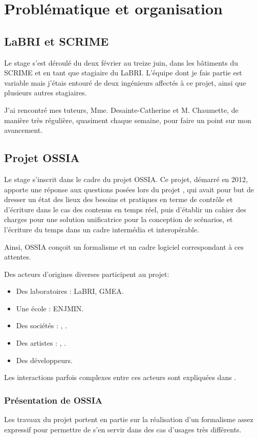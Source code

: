 \chapter{Problématique et organisation}
\section{LaBRI et SCRIME}
Le stage s'est déroulé du deux février au treize juin, dans les bâtiments du \ac{SCRIME} et en tant que stagiaire du \ac{LaBRI}. L'équipe dont je fais partie est variable mais j'étais entouré de deux ingénieurs affectés à ce projet, ainsi que plusieurs autres stagiaires.

J'ai rencontré mes tuteurs, Mme. Desainte-Catherine et M. Chaumette, de manière très régulière, quasiment chaque semaine, pour faire un point sur mon avancement.

\section{Projet OSSIA}
Le stage s'inscrit dans le cadre du projet  \ac{OSSIA}. Ce projet, démarré en 2012, apporte une réponse aux questions posées lors du projet , qui avait pour but de dresser un état des lieux des besoins et pratiques en terme de contrôle et d'écriture dans le cas des contenus en temps réel, puis d'établir un cahier des charges pour une solution unificatrice pour la conception de scénarios, et l'écriture du temps dans un cadre intermédia et interopérable.

Ainsi, \ac{OSSIA} conçoit un formalisme et un cadre logiciel correspondant à ces attentes.

Des acteurs d'origines diverses participent au projet:
\begin{itemize}
	\item Des laboratoires : \ac{LaBRI}, \ac{GMEA}.
	\item Une école : \ac{ENJMIN}.
	\item Des sociétés : , .
	\item Des artistes : , .
	\item Des développeurs.
\end{itemize}

Les interactions parfois complexes entre ces acteurs sont expliquées dans \cite{meyssonnier2013analyse}.

\subsection{Présentation de OSSIA}
Les travaux du projet portent en partie sur la réalisation d'un formalisme assez expressif pour permettre de s'en servir dans des cas d'usages très différents.

